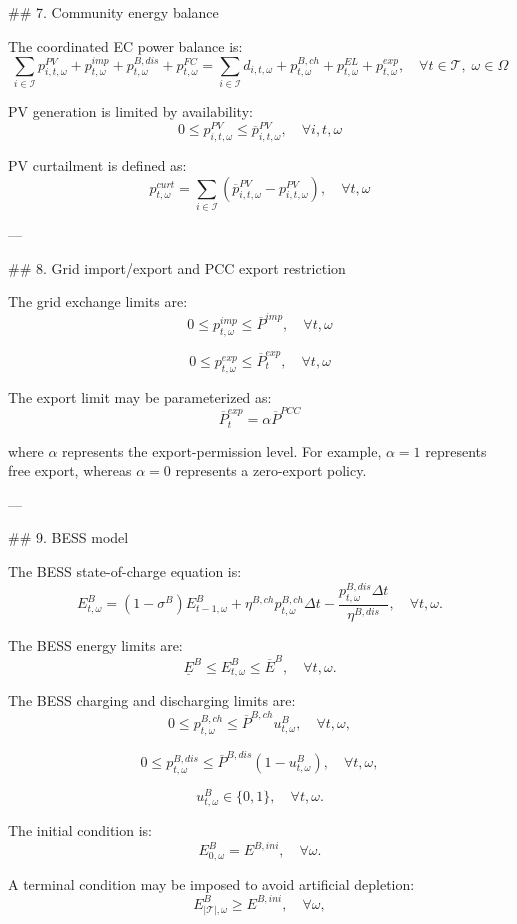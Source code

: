 ## 7. Community energy balance

The coordinated EC power balance is:
$$ \sum_{i\in\mathcal{I}}p^{PV}_{i,t,\omega} +p^{imp}_{t,\omega} +p^{B,dis}_{t,\omega} +p^{FC}_{t,\omega} = \sum_{i\in\mathcal{I}}d_{i,t,\omega} +p^{B,ch}_{t,\omega} +p^{EL}_{t,\omega} +p^{exp}_{t,\omega}, \quad \forall t\in\mathcal{T},\; \omega\in\Omega $$

PV generation is limited by availability:
$$ 0\le p^{PV}_{i,t,\omega}\le \overline{p}^{PV}_{i,t,\omega}, \quad \forall i,t,\omega $$

PV curtailment is defined as:
$$ p^{curt}_{t,\omega}=\sum_{i\in\mathcal{I}} \left(\overline{p}^{PV}_{i,t,\omega}-p^{PV}_{i,t,\omega}\right), \quad \forall t,\omega $$

---

## 8. Grid import/export and PCC export restriction

The grid exchange limits are:
$$ 0\le p^{imp}_{t,\omega}\le \overline{P}^{imp}, \quad \forall t,\omega $$

$$ 0\le p^{exp}_{t,\omega}\le \overline{P}^{exp}_{t}, \quad \forall t,\omega $$

The export limit may be parameterized as:
$$ \overline{P}^{exp}_{t}=\alpha \overline{P}^{PCC} $$

where $\alpha$ represents the export-permission level. For example, $\alpha=1$ represents free export, whereas $\alpha=0$ represents a zero-export policy.

---

## 9. BESS model

The BESS state-of-charge equation is:
$$ E^{B}_{t,\omega}=(1-\sigma^{B})E^{B}_{t-1,\omega}
+\eta^{B,ch}p^{B,ch}_{t,\omega}\Delta t
-\frac{p^{B,dis}_{t,\omega}\Delta t}{\eta^{B,dis}},
\quad \forall t,\omega. $$

The BESS energy limits are:
$$ \underline{E}^{B}\le E^{B}_{t,\omega}\le \overline{E}^{B},
\quad \forall t,\omega. $$

The BESS charging and discharging limits are:
$$ 0\le p^{B,ch}_{t,\omega}\le \overline{P}^{B,ch}u^{B}_{t,\omega},
\quad \forall t,\omega, $$

$$ 0\le p^{B,dis}_{t,\omega}\le \overline{P}^{B,dis}(1-u^{B}_{t,\omega}),
\quad \forall t,\omega, $$

$$ u^{B}_{t,\omega}\in\{0,1\},
\quad \forall t,\omega. $$

The initial condition is:
$$ E^{B}_{0,\omega}=E^{B,ini},
\quad \forall \omega. $$

A terminal condition may be imposed to avoid artificial depletion:
$$ E^{B}_{|\mathcal{T}|,\omega}\ge E^{B,ini},
\quad \forall \omega, $$

